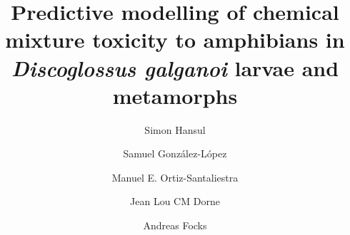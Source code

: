 \documentclass[preprint,12pt]{elsarticle}
\begin{document}
\begin{frontmatter}


\title{
    Predictive modelling of chemical mixture toxicity to amphibians in \textit{Discoglossus galganoi}
    larvae and metamorphs
    }
\author[UOS]{Simon Hansul}
\author[UCLM]{Samuel González-López}
\author[UCLM]{Manuel E. Ortiz-Santaliestra}
\author[EFSA]{Jean Lou CM Dorne}
\author[UOS]{Andreas Focks}
%
\title{} %


\author{} %




\end{frontmatter}
\end{document}
